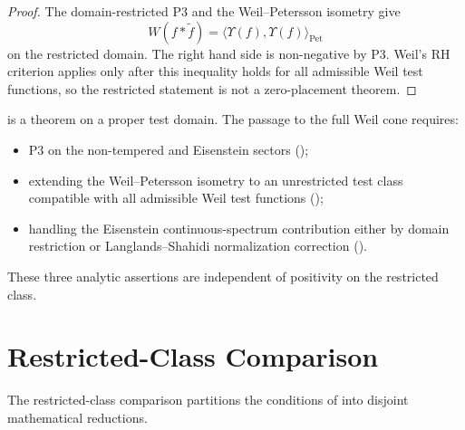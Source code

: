\begin{proof}
The domain-restricted P3 and the Weil--Petersson isometry give
\[
W(f\ast\widetilde f)
=\langle\Upsilon(f),\Upsilon(f)\rangle_{\mathrm{Pet}}
\]
on the restricted domain.  The right hand side is non-negative by
P3.  Weil's RH criterion applies only after this inequality holds for
all admissible Weil test functions, so the restricted statement is not
a zero-placement theorem.
\end{proof}

\begin{remark}
\label{v4-arith:w5-direct:rem:what-not-proved}
 is a theorem on a
proper test domain.  The passage to the full Weil cone requires:
\begin{itemize}
\item[(i)] P3 on the non-tempered and Eisenstein sectors
();
\item[(ii)] extending the Weil--Petersson isometry to an unrestricted
test class compatible with all admissible Weil test functions
();
\item[(iii)] handling the Eisenstein continuous-spectrum contribution
either by domain restriction or Langlands--Shahidi normalization
correction
().
\end{itemize}
These three analytic assertions are independent of positivity on the
restricted class.
\end{remark}

\section{Restricted-Class Comparison}
\label{v4-arith:w5-direct:construction~5-map}

The restricted-class comparison partitions the conditions of
 into disjoint
mathematical reductions.

